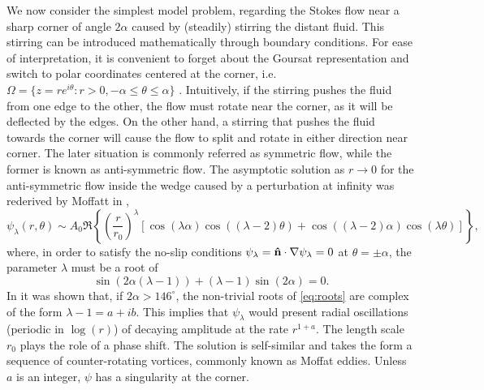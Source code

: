 We now consider the simplest model problem, regarding the Stokes flow near a sharp corner of angle $2\alpha$ caused by (steadily) stirring the distant fluid. This stirring can be introduced mathematically through boundary conditions. For ease of interpretation, it is convenient to forget about the Goursat representation and switch to polar coordinates centered at the corner, i.e. $\Omega = \{z = re^{i\theta} : r > 0, -\alpha \leq \theta \leq \alpha \}$ . Intuitively, if the stirring pushes the fluid from one edge to the other, the flow must rotate near the corner, as it will be deflected by the edges. On the other hand, a stirring that pushes the fluid towards the corner will cause the flow to split and rotate in either direction near corner. The later situation is commonly referred as symmetric flow, while the former is known as anti-symmetric flow. The asymptotic solution as $r\to 0$ for the anti-symmetric flow inside the wedge caused by a perturbation at infinity was rederived by Moffatt in \cite{moffatt64},
\begin{equation}\label{eq:antisym}
\psi_\lambda(r,\theta) \sim A_0\Re\left\{\left(\frac{r}{r_0}\right)^\lambda \left[\cos{(\lambda\alpha)}\cos{\left((\lambda-2)\theta\right)}+\cos{\left((\lambda-2)\alpha\right)}\cos{(\lambda\theta)}\right]\right\},
\end{equation}
where, in order to satisfy the no-slip conditions $\psi_\lambda=\mathbf{\hat{n}}\cdot\nabla\psi_\lambda=0$ at $\theta=\pm\alpha$, the parameter $\lambda$ must be a root of
\begin{equation}\label{eq:roots}
\sin{\left(2\alpha(\lambda-1)\right)} + (\lambda-1)\sin{(2\alpha)}=0.
\end{equation}
In \cite{dean49} it was shown that, if $2\alpha>146^\circ$, the non-trivial roots of \eqref{eq:roots} are complex of the form $\lambda-1=a + ib$. This implies that $\psi_\lambda$ would present radial oscillations (periodic in $\log(r)$) of decaying amplitude at the rate  $r^{1+a}$. The length scale $r_0$ plays the role of a phase shift. The solution is self-similar and takes the form a sequence of counter-rotating vortices, commonly known as Moffat eddies. Unless $a$ is an integer, $\psi$ has a singularity at the corner.


